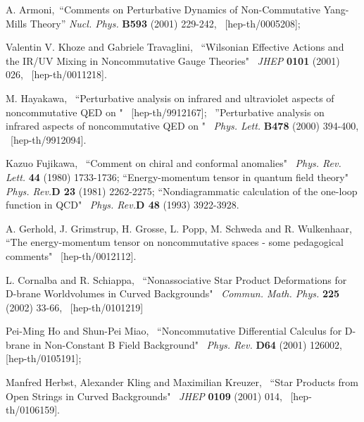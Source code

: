 \documentclass[a4paper,12pt]{article}
\begin{document}
\begin{thebibliography}{References}
A. Armoni, \,``Comments on Perturbative Dynamics of Non-Commutative Yang-Mills 
Theory'' {\it Nucl. Phys.} {\bf B593} (2001) 229-242, \, [hep-th/0005208]; 

Valentin V. Khoze and Gabriele Travaglini, \, ``Wilsonian Effective Actions and the IR/UV Mixing in Noncommutative Gauge Theories" \, 
{\it JHEP} {\bf 0101} (2001) 026, \, [hep-th/0011218]. 

M. Hayakawa, \, ``Perturbative analysis on infrared and ultraviolet aspects of 
noncommutative QED on \coordHE{}" \, [hep-th/9912167]; \,
''Perturbative analysis on infrared aspects of noncommutative QED on \coordHE{}" 
\, {\it Phys. Lett.} {\bf B478} (2000) 394-400, \, [hep-th/9912094]. 

Kazuo Fujikawa, \, ``Comment on chiral and conformal anomalies" 
\, {\it Phys. Rev. Lett.} {\bf 44} (1980) 1733-1736; 
``Energy-momentum tensor in quantum field theory" 
\, {\it Phys. Rev.}{\bf D 23} (1981) 2262-2275; 
``Nondiagrammatic calculation of the one-loop \myHighlight{$\beta$}\coordHE{} function in QCD" 
\, {\it Phys. Rev.}{\bf D 48} (1993) 3922-3928. 

A. Gerhold, J. Grimstrup, H. Grosse, L. Popp, M. Schweda and R. Wulkenhaar, \, 
``The energy-momentum tensor on noncommutative spaces - some pedagogical 
comments"  \, [hep-th/0012112]. 

L. Cornalba and R. Schiappa, \,
``Nonassociative Star Product Deformations for D-brane Worldvolumes in Curved 
Backgrounds" \, {\it Commun. Math. Phys.} {\bf 225} (2002) 33-66, 
\, [hep-th/0101219] 

Pei-Ming Ho and Shun-Pei Miao, \, 
``Noncommutative Differential Calculus for D-brane in Non-Constant B Field 
Background"  \, {\it Phys. Rev.} {\bf D64} (2001) 126002, \,[hep-th/0105191]; 

Manfred Herbst, Alexander Kling and Maximilian Kreuzer, \,
``Star Products from Open Strings in Curved Backgrounds"  
\, {\it JHEP} {\bf 0109} (2001) 014, \, [hep-th/0106159]. 

\end{thebibliography}
\end{document}
